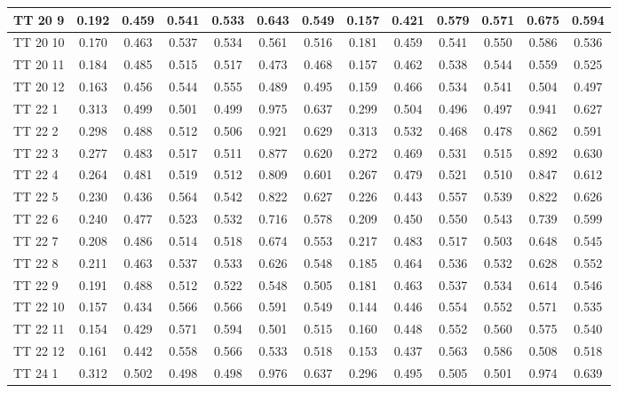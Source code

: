 \documentclass{article}
\begin{document}
\begin{tabular}{|l|c|c|c|c|c|c||c|c|c|c|c|c|}
TT 20  9 & 0.192 & 0.459 & 0.541 & 0.533 & 0.643 & 0.549 & 0.157 & 0.421 & 0.579 & 0.571 & 0.675 & 0.594\\ \hline
TT 20 10 & 0.170 & 0.463 & 0.537 & 0.534 & 0.561 & 0.516 & 0.181 & 0.459 & 0.541 & 0.550 & 0.586 & 0.536\\ \hline
TT 20 11 & 0.184 & 0.485 & 0.515 & 0.517 & 0.473 & 0.468 & 0.157 & 0.462 & 0.538 & 0.544 & 0.559 & 0.525\\ \hline
TT 20 12 & 0.163 & 0.456 & 0.544 & 0.555 & 0.489 & 0.495 & 0.159 & 0.466 & 0.534 & 0.541 & 0.504 & 0.497\\ \hline
TT 22  1 & 0.313 & 0.499 & 0.501 & 0.499 & 0.975 & 0.637 & 0.299 & 0.504 & 0.496 & 0.497 & 0.941 & 0.627\\ \hline
TT 22  2 & 0.298 & 0.488 & 0.512 & 0.506 & 0.921 & 0.629 & 0.313 & 0.532 & 0.468 & 0.478 & 0.862 & 0.591\\ \hline
TT 22  3 & 0.277 & 0.483 & 0.517 & 0.511 & 0.877 & 0.620 & 0.272 & 0.469 & 0.531 & 0.515 & 0.892 & 0.630\\ \hline
TT 22  4 & 0.264 & 0.481 & 0.519 & 0.512 & 0.809 & 0.601 & 0.267 & 0.479 & 0.521 & 0.510 & 0.847 & 0.612\\ \hline
TT 22  5 & 0.230 & 0.436 & 0.564 & 0.542 & 0.822 & 0.627 & 0.226 & 0.443 & 0.557 & 0.539 & 0.822 & 0.626\\ \hline
TT 22  6 & 0.240 & 0.477 & 0.523 & 0.532 & 0.716 & 0.578 & 0.209 & 0.450 & 0.550 & 0.543 & 0.739 & 0.599\\ \hline
TT 22  7 & 0.208 & 0.486 & 0.514 & 0.518 & 0.674 & 0.553 & 0.217 & 0.483 & 0.517 & 0.503 & 0.648 & 0.545\\ \hline
TT 22  8 & 0.211 & 0.463 & 0.537 & 0.533 & 0.626 & 0.548 & 0.185 & 0.464 & 0.536 & 0.532 & 0.628 & 0.552\\ \hline
TT 22  9 & 0.191 & 0.488 & 0.512 & 0.522 & 0.548 & 0.505 & 0.181 & 0.463 & 0.537 & 0.534 & 0.614 & 0.546\\ \hline
TT 22 10 & 0.157 & 0.434 & 0.566 & 0.566 & 0.591 & 0.549 & 0.144 & 0.446 & 0.554 & 0.552 & 0.571 & 0.535\\ \hline
TT 22 11 & 0.154 & 0.429 & 0.571 & 0.594 & 0.501 & 0.515 & 0.160 & 0.448 & 0.552 & 0.560 & 0.575 & 0.540\\ \hline
TT 22 12 & 0.161 & 0.442 & 0.558 & 0.566 & 0.533 & 0.518 & 0.153 & 0.437 & 0.563 & 0.586 & 0.508 & 0.518\\ \hline
TT 24  1 & 0.312 & 0.502 & 0.498 & 0.498 & 0.976 & 0.637 & 0.296 & 0.495 & 0.505 & 0.501 & 0.974 & 0.639\\ \hline

\end{tabular}
\end{document}
